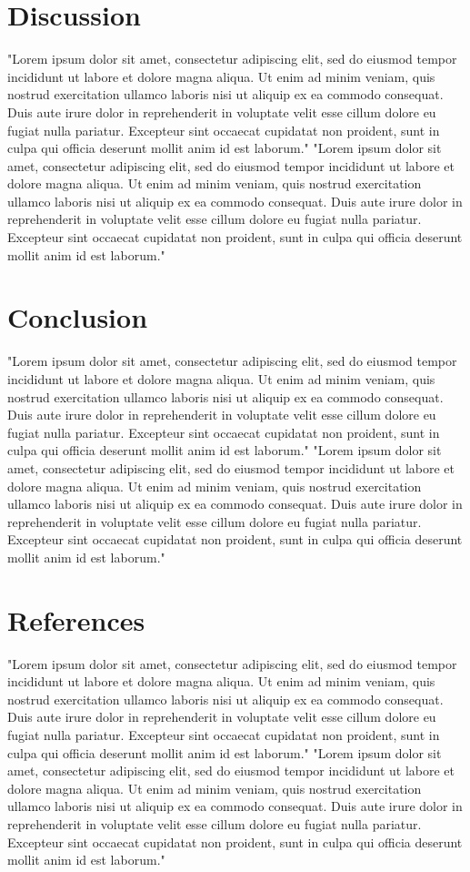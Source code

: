 \documentclass{proc}
\begin{document}
	\section{Discussion}
	"Lorem ipsum dolor sit amet, consectetur adipiscing elit, sed do eiusmod tempor incididunt ut labore et dolore magna aliqua. Ut enim ad minim veniam, quis nostrud exercitation ullamco laboris nisi ut aliquip ex ea commodo consequat. Duis aute irure dolor in reprehenderit in voluptate velit esse cillum dolore eu fugiat nulla pariatur. Excepteur sint occaecat cupidatat non proident, sunt in culpa qui officia deserunt mollit anim id est laborum."
	"Lorem ipsum dolor sit amet, consectetur adipiscing elit, sed do eiusmod tempor incididunt ut labore et dolore magna aliqua. Ut enim ad minim veniam, quis nostrud exercitation ullamco laboris nisi ut aliquip ex ea commodo consequat. Duis aute irure dolor in reprehenderit in voluptate velit esse cillum dolore eu fugiat nulla pariatur. Excepteur sint occaecat cupidatat non proident, sunt in culpa qui officia deserunt mollit anim id est laborum."
	\section{Conclusion}
	"Lorem ipsum dolor sit amet, consectetur adipiscing elit, sed do eiusmod tempor incididunt ut labore et dolore magna aliqua. Ut enim ad minim veniam, quis nostrud exercitation ullamco laboris nisi ut aliquip ex ea commodo consequat. Duis aute irure dolor in reprehenderit in voluptate velit esse cillum dolore eu fugiat nulla pariatur. Excepteur sint occaecat cupidatat non proident, sunt in culpa qui officia deserunt mollit anim id est laborum."
	"Lorem ipsum dolor sit amet, consectetur adipiscing elit, sed do eiusmod tempor incididunt ut labore et dolore magna aliqua. Ut enim ad minim veniam, quis nostrud exercitation ullamco laboris nisi ut aliquip ex ea commodo consequat. Duis aute irure dolor in reprehenderit in voluptate velit esse cillum dolore eu fugiat nulla pariatur. Excepteur sint occaecat cupidatat non proident, sunt in culpa qui officia deserunt mollit anim id est laborum."
	\section{References}
	"Lorem ipsum dolor sit amet, consectetur adipiscing elit, sed do eiusmod tempor incididunt ut labore et dolore magna aliqua. Ut enim ad minim veniam, quis nostrud exercitation ullamco laboris nisi ut aliquip ex ea commodo consequat. Duis aute irure dolor in reprehenderit in voluptate velit esse cillum dolore eu fugiat nulla pariatur. Excepteur sint occaecat cupidatat non proident, sunt in culpa qui officia deserunt mollit anim id est laborum."
	"Lorem ipsum dolor sit amet, consectetur adipiscing elit, sed do eiusmod tempor incididunt ut labore et dolore magna aliqua. Ut enim ad minim veniam, quis nostrud exercitation ullamco laboris nisi ut aliquip ex ea commodo consequat. Duis aute irure dolor in reprehenderit in voluptate velit esse cillum dolore eu fugiat nulla pariatur. Excepteur sint occaecat cupidatat non proident, sunt in culpa qui officia deserunt mollit anim id est laborum."
\end{document}
